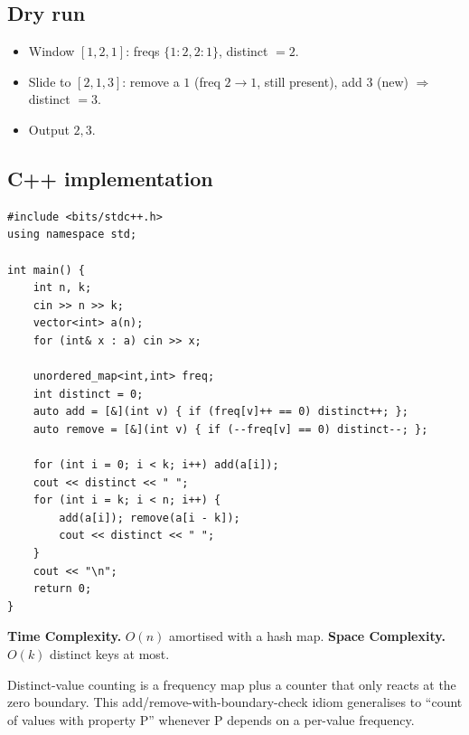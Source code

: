 \subsection*{Dry run}


\begin{itemize}
  \item Window $[1,2,1]$: freqs $\{1{:}2,2{:}1\}$, distinct $=2$.
  \item Slide to $[2,1,3]$: remove a $1$ (freq $2{\to}1$, still present),
        add $3$ (new) $\Rightarrow$ distinct $=3$.
  \item Output $2,3$.
\end{itemize}

\subsection*{C++ implementation}

\begin{lstlisting}
#include <bits/stdc++.h>
using namespace std;

int main() {
    int n, k;
    cin >> n >> k;
    vector<int> a(n);
    for (int& x : a) cin >> x;

    unordered_map<int,int> freq;
    int distinct = 0;
    auto add = [&](int v) { if (freq[v]++ == 0) distinct++; };
    auto remove = [&](int v) { if (--freq[v] == 0) distinct--; };

    for (int i = 0; i < k; i++) add(a[i]);
    cout << distinct << " ";
    for (int i = k; i < n; i++) {
        add(a[i]); remove(a[i - k]);
        cout << distinct << " ";
    }
    cout << "\n";
    return 0;
}
\end{lstlisting}

\begin{complexitybox}
\textbf{Time Complexity.} $O(n)$ amortised with a hash map.
\textbf{Space Complexity.} $O(k)$ distinct keys at most.
\end{complexitybox}

\begin{takeawaybox}
Distinct-value counting is a frequency map plus a counter that only reacts
at the zero boundary. This add/remove-with-boundary-check idiom generalises
to ``count of values with property P'' whenever P depends on a per-value
frequency.
\end{takeawaybox}
